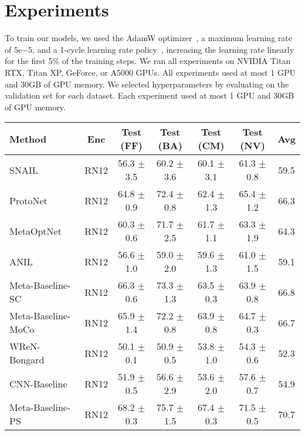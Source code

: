 
\section{Experiments}\label{sec:exp}

To train our models, we used the AdamW optimizer~\cite{loshchilov2017decoupled}, a maximum learning rate of $5\mathrm{e}{-5}$, and a 1-cycle learning rate policy~\cite{smith2019super}, increasing the learning rate linearly for the first 5\% of the training steps.
We ran all experiments on NVIDIA Titan RTX, Titan XP, GeForce, or A5000 GPUs. All experiments used at most 1 GPU and 30GB of GPU memory.
We selected hyperparameters by evaluating on the validation set for each dataset.
Each experiment used at most 1 GPU and 30GB of GPU memory.



\begin{table*}
  \centering
    \begin{tabular}{lcccccc}
    \toprule
    Method & Enc & Test (FF) & Test (BA) & Test (CM) & Test (NV) & Avg \\
    \midrule
    SNAIL~\cite{mishra2018simple} & RN12 & 56.3 $\pm$ 3.5& 60.2 $\pm$ 3.6 & 60.1 $\pm$ 3.1 & 61.3 $\pm$ 0.8 & 59.5 \\
    ProtoNet~\cite{snell2017prototypical} & RN12 & 64.8 $\pm$ 0.9 &72.4 $\pm$ 0.8  & 62.4 $\pm$ 1.3 & 65.4 $\pm$ 1.2  &  66.3 \\
    MetaOptNet~\cite{lee2019meta} & RN12 &60.3 $\pm$ 0.6 & 71.7 $\pm$ 2.5 & 61.7 $\pm$ 1.1 & 63.3 $\pm$ 1.9  &  64.3 \\
    ANIL~\cite{raghu2020rapid} & RN12 & 56.6 $\pm$ 1.0 & 59.0 $\pm$ 2.0 & 59.6 $\pm$ 1.3 & 61.0 $\pm$ 1.5  &  59.1 \\
    Meta-Baseline-SC~\cite{chen2020new} & RN12 &66.3 $\pm$ 0.6 & 73.3 $\pm$ 1.3 & 63.5 $\pm$ 0.3 & 63.9 $\pm$ 0.8  &  66.8 \\
    Meta-Baseline-MoCo~\cite{nie2021bongardlogo} & RN12 &65.9 $\pm$ 1.4 & 72.2 $\pm$ 0.8 & 63.9 $\pm$ 0.8 & 64.7 $\pm$ 0.3  & 66.7  \\
    WReN-Bongard~\cite{barrett2018measuring} & RN12 &50.1 $\pm$ 0.1 & 50.9 $\pm$ 0.5 & 53.8 $\pm$ 1.0 & 54.3 $\pm$ 0.6  &  52.3 \\
    CNN-Baseline~\cite{nie2021bongardlogo} & RN12 &51.9 $\pm$ 0.5 & 56.6 $\pm$ 2.9 & 53.6 $\pm$ 2.0 & 57.6 $\pm$ 0.7  &  54.9 \\
    Meta-Baseline-PS~\cite{nie2021bongardlogo} & RN12 & 68.2 $\pm$ 0.3 & 75.7 $\pm$ 1.5 & 67.4 $\pm$ 0.3 & 71.5 $\pm$ 0.5 & 70.7 \\ 

\end{tabular}
\end{table*}
